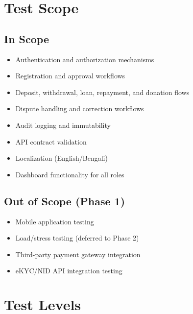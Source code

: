 \documentclass[11pt,a4paper]{article}
\begin{document}
\section{Test Scope}

\subsection{In Scope}
\begin{itemize}
    \item Authentication and authorization mechanisms
    \item Registration and approval workflows
    \item Deposit, withdrawal, loan, repayment, and donation flows
    \item Dispute handling and correction workflows
    \item Audit logging and immutability
    \item API contract validation
    \item Localization (English/Bengali)
    \item Dashboard functionality for all roles
\end{itemize}

\subsection{Out of Scope (Phase 1)}
\begin{itemize}
    \item Mobile application testing
    \item Load/stress testing (deferred to Phase 2)
    \item Third-party payment gateway integration
    \item eKYC/NID API integration testing
\end{itemize}

\section{Test Levels}
\end{document}
